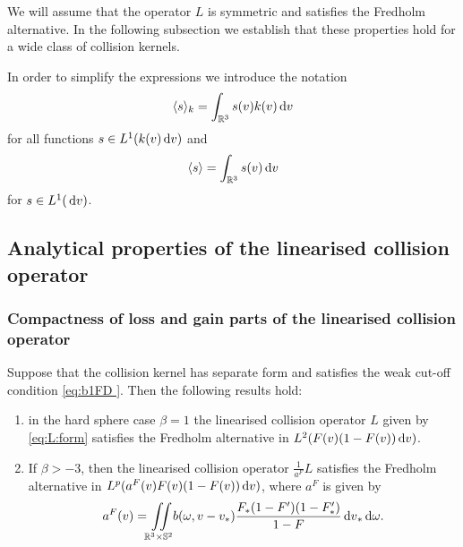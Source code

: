 We will assume that the operator $L$ is symmetric and satisfies the Fredholm alternative. In the following subsection we establish 
that these properties hold for a wide class of collision kernels.

 In order to simplify the expressions we introduce the notation \[\langle s\rangle_k = \int_{\mathbb {R}^3} s(v)k(v){\,\mathrm{d} v}\] for all functions $s\in L^1(k(v){\,\mathrm{d} v})$ and \[\langle s\rangle = \int_{\mathbb {R}^3} s(v) {\,\mathrm{d} v}\] for $s\in L^1({\,\mathrm{d} v})$.
\subsection{Analytical properties of the linearised collision operator}

 
\subsubsection{Compactness of loss and gain parts of the linearised collision operator}
\label{sssec:fred}
\begin{theorem}\label{th:com:exa}
Suppose that the collision kernel has separate form and satisfies the weak cut-off condition \eqref{eq:b1FD
}. Then the following results hold:
\begin{enumerate}
\item in the hard sphere case $\beta=1$ the linearised collision operator $L$ given by \eqref{eq:L:form} satisfies the Fredholm alternative in $L^2( F(v)(1-F(v)){\,\mathrm{d} v})$.
\item If $\beta>-3$,  %
 then the linearised collision operator
 $\frac{1}{a^F}L$ satisfies the Fredholm alternative in 
	$L^p( a^F(v)F(v)(1-F(v)){\,\mathrm{d} v})$, where $a^F$ is given by
	\[a^F(v) = {\iint\limits_{\mathbb R^3\times\mathbb S^2}} b (\omega,v-v_\ast )\frac{F_\ast(1-F')(1-F'_\ast )}{1-F} {\,\mathrm{d} v}_\ast  {\,\mathrm{d} \omega}.\]
\end{enumerate}

\end{theorem}
